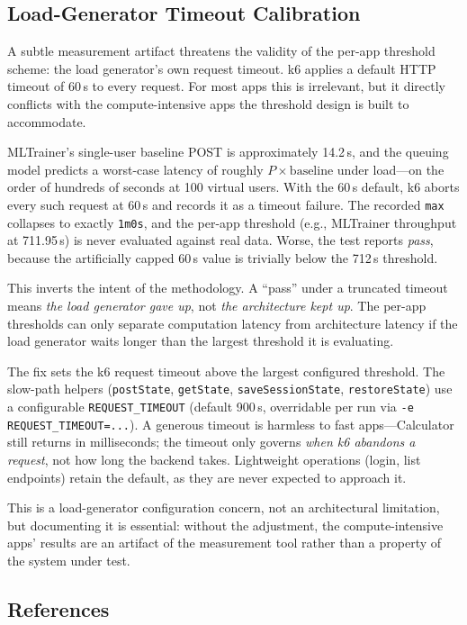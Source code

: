 \documentclass[11pt,a4paper]{article}
\begin{document}
\subsection{Load-Generator Timeout Calibration}

A subtle measurement artifact threatens the validity of the per-app
threshold scheme: the load generator's own request timeout. k6 applies
a default HTTP timeout of 60\,s to every request. For most apps this is
irrelevant, but it directly conflicts with the compute-intensive apps
the threshold design is built to accommodate.

MLTrainer's single-user baseline POST is approximately 14.2\,s, and the
queuing model predicts a worst-case latency of roughly
$P \times \text{baseline}$ under load---on the order of hundreds of
seconds at 100 virtual users. With the 60\,s default, k6 aborts every
such request at 60\,s and records it as a timeout failure. The recorded
\texttt{max} collapses to exactly \texttt{1m0s}, and the per-app
threshold (e.g., MLTrainer throughput at 711.95\,s) is never evaluated
against real data. Worse, the test reports \emph{pass}, because the
artificially capped 60\,s value is trivially below the 712\,s threshold.

This inverts the intent of the methodology. A ``pass'' under a truncated
timeout means \emph{the load generator gave up}, not \emph{the
architecture kept up}. The per-app thresholds can only separate
computation latency from architecture latency if the load generator
waits longer than the largest threshold it is evaluating.

The fix sets the k6 request timeout above the largest configured
threshold. The slow-path helpers (\texttt{postState}, \texttt{getState},
\texttt{saveSessionState}, \texttt{restoreState}) use a configurable
\texttt{REQUEST\_TIMEOUT} (default 900\,s, overridable per run via
\texttt{-e REQUEST\_TIMEOUT=...}). A generous timeout is harmless to
fast apps---Calculator still returns in milliseconds; the timeout only
governs \emph{when k6 abandons a request}, not how long the backend
takes. Lightweight operations (login, list endpoints) retain the
default, as they are never expected to approach it.

This is a load-generator configuration concern, not an architectural
limitation, but documenting it is essential: without the adjustment, the
compute-intensive apps' results are an artifact of the measurement tool
rather than a property of the system under test.

\subsection{References}
\end{document}
